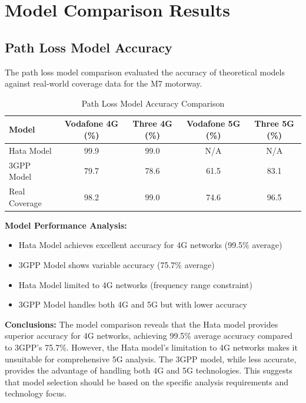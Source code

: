 \documentclass[MScCS]{uccthesis}
\begin{document}
\section{Model Comparison Results}

\subsection{Path Loss Model Accuracy}

The path loss model comparison evaluated the accuracy of theoretical models against real-world coverage data for the M7 motorway.

\begin{table}[h]
\centering
\caption{Path Loss Model Accuracy Comparison}
\label{tab:model_accuracy}
\begin{tabular}{|l|c|c|c|c|}
\hline
\textbf{Model} & \textbf{Vodafone 4G (\%)} & \textbf{Three 4G (\%)} & \textbf{Vodafone 5G (\%)} & \textbf{Three 5G (\%)} \\
\hline
Hata Model & 99.9 & 99.0 & N/A & N/A \\
\hline
3GPP Model & 79.7 & 78.6 & 61.5 & 83.1 \\
\hline
Real Coverage & 98.2 & 99.0 & 74.6 & 96.5 \\
\hline
\end{tabular}
\end{table}

\textbf{Model Performance Analysis:}
\begin{itemize}
\item Hata Model achieves excellent accuracy for 4G networks (99.5\% average)
\item 3GPP Model shows variable accuracy (75.7\% average)
\item Hata Model limited to 4G networks (frequency range constraint)
\item 3GPP Model handles both 4G and 5G but with lower accuracy
\end{itemize}

\textbf{Conclusions:} The model comparison reveals that the Hata model provides superior accuracy for 4G networks, achieving 99.5\% average accuracy compared to 3GPP's 75.7\%. However, the Hata model's limitation to 4G networks makes it unsuitable for comprehensive 5G analysis. The 3GPP model, while less accurate, provides the advantage of handling both 4G and 5G technologies. This suggests that model selection should be based on the specific analysis requirements and technology focus.
\end{document}
